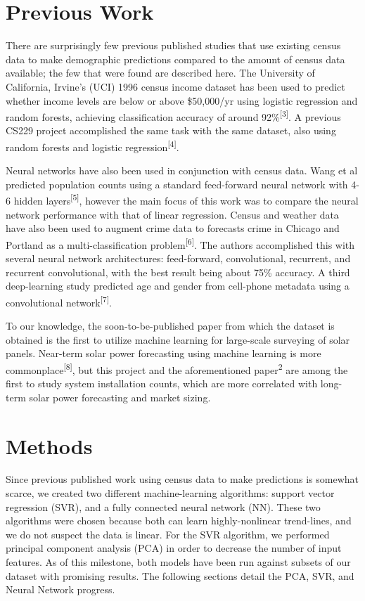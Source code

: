 \documentclass{article}
\begin{document}
	
	\section{Previous Work}
	\label{previous_work}
	
	There are surprisingly few previous published studies that use existing census data to make demographic predictions compared to the amount of census data available; the few that were found are described here. The University of California, Irvine’s (UCI) 1996 census income dataset has been used to predict whether income levels are below or above \$50,000/yr using logistic regression and random forests, achieving classification accuracy of around 92\%\textsuperscript{[3]}. A previous CS229 project accomplished the same task with the same dataset, also using random forests and logistic regression\textsuperscript{[4]}.
	
	Neural networks have also been used in conjunction with census data. Wang et al predicted population counts using a standard feed-forward neural network with 4-6 hidden layers\textsuperscript{[5]}, however the main focus of this work was to compare the neural network performance with that of linear regression. Census and weather data have also been used to augment crime data to forecasts crime in Chicago and Portland as a multi-classification problem\textsuperscript{[6]}. The authors accomplished this with several neural network architectures: feed-forward, convolutional, recurrent, and recurrent convolutional, with the best result being about 75\% accuracy. A third deep-learning study predicted age and gender from cell-phone metadata using a convolutional network\textsuperscript{[7]}. 
	
	To our knowledge, the soon-to-be-published paper from which the dataset is obtained is the first to utilize machine learning for large-scale surveying of solar panels. Near-term solar power forecasting using machine learning is more commonplace\textsuperscript{[8]}, but this project and the aforementioned paper\textsuperscript{2} are among the first to study system installation counts, which are more correlated with long-term solar power forecasting and market sizing.
	
	
	\section{Methods}
	
	Since previous published work using census data to make predictions is somewhat scarce, we created two different machine-learning algorithms: support vector regression (SVR), and a fully connected neural network (NN). These two algorithms were chosen because both can learn highly-nonlinear trend-lines, and we do not suspect the data is linear. For the SVR algorithm, we performed principal component analysis (PCA) in order to decrease the number of input features. As of this milestone, both models have been run against subsets of our dataset with promising results. The following sections detail the PCA, SVR, and Neural Network progress.
	
\end{document}
